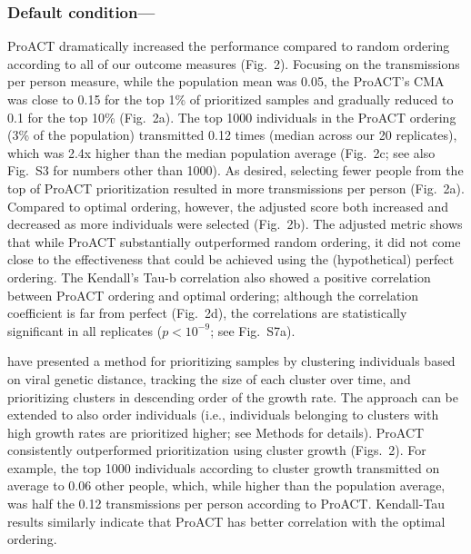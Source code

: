\documentclass[a4paper,10pt]{article}
\newcommand{\TODO}[1]{{\color{red} #1} }
\newcommand{\PLWH}{sample\xspace}
\begin{document}
\subsubsection{Default condition---}
ProACT dramatically increased the performance compared to random ordering according to all of our outcome measures (Fig.~2).
Focusing on the transmissions per person measure, while the population mean was 0.05, the ProACT's CMA was close to 0.15 for the top 1\% of prioritized \PLWH{s} and gradually reduced to 0.1 for the top 10\% (Fig.~2a).
The top 1000 individuals in the ProACT ordering (3\% of the population)  transmitted {0.12} times (median across our 20 replicates), which was 2.4x  higher than the median population average (Fig.~2c; see also Fig.~S3 for numbers other than 1000).
As desired, selecting fewer people from the top of ProACT prioritization resulted in more transmissions per person (Fig.~2a).
Compared to optimal ordering, however, the adjusted score both increased and decreased as more individuals were selected (Fig.~2b). 
The adjusted metric shows that while ProACT substantially outperformed random ordering, it did not come close to the effectiveness that could be achieved using the (hypothetical) perfect ordering. 
The Kendall's Tau-b correlation also showed a positive correlation between ProACT ordering and optimal ordering;  although the correlation coefficient is far from perfect (Fig.~2d), the correlations are statistically significant in all replicates ($p<10^{-9}$; see Fig.~S7a).




\textcite{Wertheim2018} have presented a method for prioritizing \PLWH{s} by clustering individuals based on viral genetic distance, tracking the size of each cluster over time, and prioritizing clusters in descending order of the growth rate. The approach can be extended to also order individuals (i.e., individuals belonging to clusters with high growth rates are prioritized higher; see Methods for details).
ProACT consistently outperformed prioritization using cluster growth  (Figs.~2).
For example, the top 1000 individuals according to cluster growth transmitted on average to 0.06 other people, which, while higher than the population average, was half the 0.12 transmissions per person according to ProACT. 
Kendall-Tau results similarly indicate that ProACT has better correlation with the optimal ordering.
\end{document}
